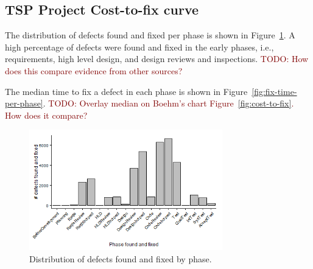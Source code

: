 \documentclass{sig-alternate}
\newcommand{\todo}[1]{\textcolor{Maroon}{TODO: #1}}
\newcommand{\fig}[1]{Figure~\ref{fig:#1}}
\begin{document}
\subsection{TSP Project Cost-to-fix curve}

The distribution of defects found and fixed per phase is shown in Figure~\ref{fig:fix-phase-dist}. A high percentage of defects were found and fixed in the early phases, i.e., requirements, high level design, and design reviews and inspections. \todo{How does this compare evidence from other sources?}

The median time to fix a defect in each phase is shown in \fig{fix-time-per-phase}. \todo{Overlay median on Boehm's chart \fig{cost-to-fix}. How does it compare?}




\begin{figure}[!ht]
\begin{center}
\includegraphics[width=3.3in]{fix-phase-dist.png}
\end{center}
\caption{Distribution of defects found and fixed by phase.}
\label{fig:fix-phase-dist}
\end{figure}
\end{document}
